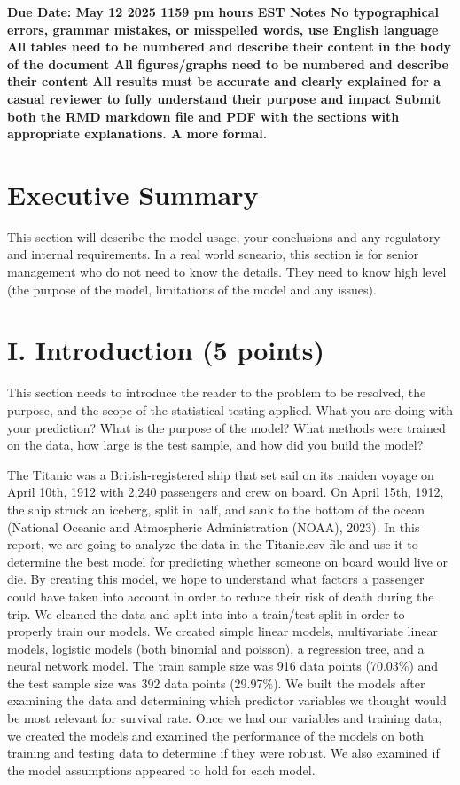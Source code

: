 \documentclass[
  letterpaper,
  DIV=11,
  numbers=noendperiod]{scrartcl}
\begin{document}
\textbf{Due Date: May 12 2025 1159 pm hours EST Notes No typographical
errors, grammar mistakes, or misspelled words, use English language All
tables need to be numbered and describe their content in the body of the
document All figures/graphs need to be numbered and describe their
content All results must be accurate and clearly explained for a casual
reviewer to fully understand their purpose and impact Submit both the
RMD markdown file and PDF with the sections with appropriate
explanations. A more formal.}

\section{Executive Summary}\label{executive-summary}

This section will describe the model usage, your conclusions and any
regulatory and internal requirements. In a real world scneario, this
section is for senior management who do not need to know the details.
They need to know high level (the purpose of the model, limitations of
the model and any issues).

\section{I. Introduction (5 points)}\label{i.-introduction-5-points}

This section needs to introduce the reader to the problem to be
resolved, the purpose, and the scope of the statistical testing applied.
What you are doing with your prediction? What is the purpose of the
model? What methods were trained on the data, how large is the test
sample, and how did you build the model?

The Titanic was a British-registered ship that set sail on its maiden
voyage on April 10th, 1912 with 2,240 passengers and crew on board. On
April 15th, 1912, the ship struck an iceberg, split in half, and sank to
the bottom of the ocean (National Oceanic and Atmospheric Administration
(NOAA), 2023). In this report, we are going to analyze the data in the
Titanic.csv file and use it to determine the best model for predicting
whether someone on board would live or die. By creating this model, we
hope to understand what factors a passenger could have taken into
account in order to reduce their risk of death during the trip. We
cleaned the data and split into into a train/test split in order to
properly train our models. We created simple linear models, multivariate
linear models, logistic models (both binomial and poisson), a regression
tree, and a neural network model. The train sample size was 916 data
points (70.03\%) and the test sample size was 392 data points (29.97\%).
We built the models after examining the data and determining which
predictor variables we thought would be most relevant for survival rate.
Once we had our variables and training data, we created the models and
examined the performance of the models on both training and testing data
to determine if they were robust. We also examined if the model
assumptions appeared to hold for each model.
\end{document}

